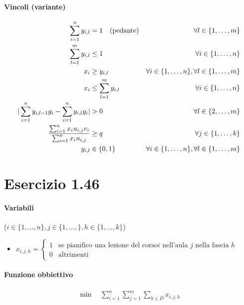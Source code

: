 \documentclass{article}
\begin{document}
\paragraph{Vincoli (variante)}
\begin{alignat}{2}
  \setcounter{equation}{3}
  \sum_{i=1}^n y_{i,l} &= 1 \quad\text{(pedante)} &\forall l \in \{1,\ldots,m\}\\
  \sum_{l=1}^m y_{i,l} &\leq 1 &\forall i \in \{1,\ldots,n\}\\
  x_i &\geq y_{i,l} &\forall i \in \{1,\ldots,n\}, \forall l \in \{1,\ldots,m\}\\
  x_i &\leq \sum_{l=1}^m y_{i,l} &\forall i \in \{1,\ldots,n\}\\
  |\sum_{i=1}^n y_{i,l-1} g_i - \sum_{i=1}^n y_{i,l}y_i| &> 0 &\forall l \in \{2,\ldots,m\}\\
  \frac{\sum_{i=1}^n x_i u_{i,j} v_i}{\sum_{i=1}^n x_i u_{i,j}} &\geq q &\forall j \in \{1,\ldots,k\}\\
  y_{i,l} &\in \{0,1\} \quad &\forall i \in \{1,\ldots,n\}, \forall l \in \{1,\ldots,m\}
\end{alignat}

\pagebreak
\section{Esercizio 1.46}

\paragraph{Variabili} ($i \in \{1,\ldots,n\}, j \in \{1,\ldots,\}, h \in \{1,\ldots,k\}$)
\begin{itemize}
  \item $x_{i,j,h} = \begin{cases}
    1 &\text{se pianifico una lezione del corso}i\text{ nell'aula }j\text{ nella fascia }h\\
    0 &\text{altrimenti}
  \end{cases}$
\end{itemize}

\paragraph{Funzione obbiettivo}
\begin{align*}
  \min \quad \sum_{i=1}^n\sum_{j=1}^m\sum_{h \in D} x_{i,j,h}
\end{align*}
\end{document}
